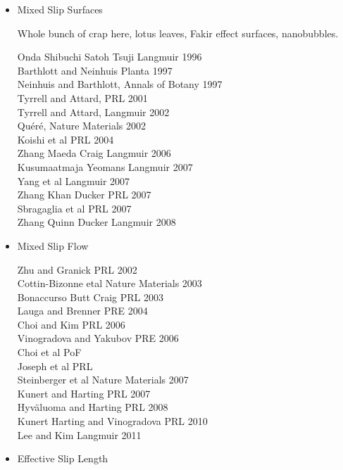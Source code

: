\documentclass{article}
\begin{document}
\begin{itemize}
\item Mixed Slip Surfaces

Whole bunch of crap here, lotus leaves, Fakir effect surfaces, nanobubbles.

Onda Shibuchi Satoh Tsuji Langmuir 1996 \\
Barthlott and Neinhuis Planta 1997 \\
Neinhuis and Barthlott, Annals of Botany 1997 \\
Tyrrell and Attard, PRL 2001 \\
Tyrrell and Attard, Langmuir 2002 \\
Qu\'{e}r\'{e}, Nature Materials 2002 \\
Koishi et al PRL 2004 \\
Zhang Maeda Craig Langmuir 2006 \\
Kusumaatmaja Yeomans Langmuir 2007 \\
Yang et al Langmuir 2007 \\
Zhang Khan Ducker PRL 2007 \\
Sbragaglia et al PRL 2007 \\
Zhang Quinn Ducker Langmuir 2008 \\

\item Mixed Slip Flow

Zhu and Granick PRL 2002 \\
Cottin-Bizonne etal Nature Materials 2003 \\
Bonaccurso Butt Craig PRL 2003 \\
Lauga and Brenner PRE 2004 \\
Choi and Kim PRL 2006 \\
Vinogradova and Yakubov PRE 2006 \\
Choi et al PoF \\
Joseph et al PRL \\
Steinberger et al Nature Materials 2007 \\
Kunert and Harting PRL 2007 \\
Hyv\"{a}luoma and Harting PRL 2008 \\
Kunert Harting and Vinogradova PRL 2010 \\
Lee and Kim Langmuir 2011 \\

\item Effective Slip Length


\end{itemize}
\end{document}

